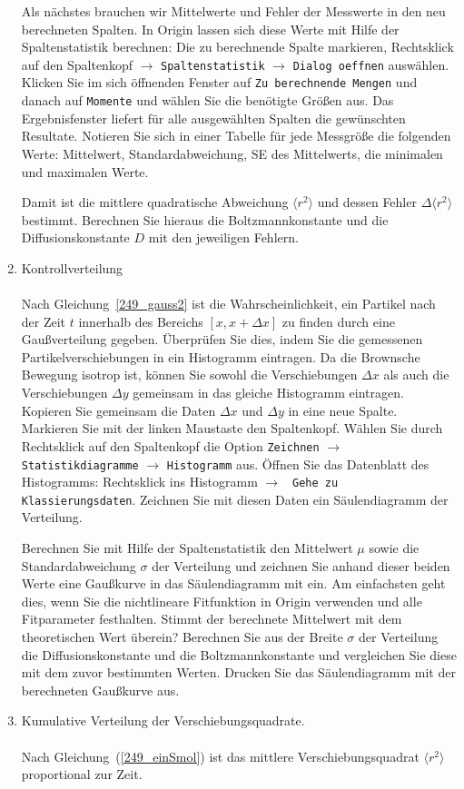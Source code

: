 \documentclass{../papanleitung}
\begin{document}
\begin{enumerate}
Als n\"{a}chstes brauchen wir Mittelwerte und Fehler der Messwerte in den neu berechneten
Spalten. In Origin lassen sich diese Werte mit Hilfe der Spaltenstatistik berechnen:
Die zu berechnende Spalte markieren, Rechtsklick auf den Spaltenkopf $\rightarrow$ \verb"Spaltenstatistik" $\rightarrow$ \verb"Dialog oeffnen" ausw\"{a}hlen.
Klicken Sie im sich \"{o}ffnenden Fenster auf  \verb"Zu berechnende Mengen" und danach auf \verb"Momente" und w\"{a}hlen Sie die ben\"{o}tigte Gr\"{o}{\ss}en aus.
Das Ergebnisfenster liefert f\"{u}r alle ausgew\"{a}hlten Spalten die gew\"{u}nschten Resultate.
Notieren Sie sich in einer Tabelle f\"{u}r jede Messgr\"{o}{\ss}e die folgenden Werte:
Mittelwert, Standardabweichung, SE des Mittelwerts, die minimalen und maximalen Werte.

Damit ist die mittlere quadratische Abweichung $\langle r^2 \rangle$ und dessen Fehler $\Delta\langle r^2 \rangle$ bestimmt.
Berechnen Sie hieraus die Boltzmannkonstante und die Diffusionskonstante $D$ mit den jeweiligen Fehlern.

\item Kontrollverteilung\\
\\Nach Gleichung~\ref{249_gauss2} ist die Wahrscheinlichkeit,
ein Partikel nach der Zeit $t$ innerhalb des Bereichs $[x,x+\Delta
x]$ zu finden durch eine Gau{\ss}verteilung gegeben. \"{U}berpr\"{u}fen Sie
dies, indem Sie die gemessenen Partikelverschiebungen in ein
Histogramm eintragen. Da die Brownsche Bewegung isotrop ist,
k\"{o}nnen Sie sowohl die Verschiebungen $\Delta x$ als auch die
Verschiebungen $\Delta y$ gemeinsam in das gleiche Histogramm
eintragen. Kopieren Sie gemeinsam die Daten $\Delta x$ und $\Delta y$ in eine neue Spalte. Markieren Sie mit der linken Maustaste den Spaltenkopf. W\"{a}hlen Sie durch Rechtsklick auf den Spaltenkopf die Option \verb"Zeichnen" $\rightarrow$ \verb"Statistikdiagramme" $\rightarrow$ \verb"Histogramm" aus. \"{O}ffnen Sie das Datenblatt des Histogramms: Rechtsklick ins Histogramm $\rightarrow$ \verb" Gehe zu Klassierungsdaten". Zeichnen Sie mit diesen Daten ein S\"{a}ulendiagramm der Verteilung.


Berechnen Sie mit Hilfe der Spaltenstatistik den Mittelwert $\mu$ sowie die
Standardabweichung $\sigma$ der Verteilung und zeichnen Sie anhand
dieser beiden Werte eine Gau{\ss}kurve in das S\"{a}ulendiagramm mit ein. Am einfachsten geht dies, wenn Sie die nichtlineare Fitfunktion in Origin verwenden und alle
Fitparameter festhalten.
Stimmt der berechnete Mittelwert mit dem theoretischen Wert
\"{u}berein? Berechnen Sie aus der Breite $\sigma$ der Verteilung die
Diffusions\-konstante und die Boltzmannkonstante und vergleichen
Sie diese mit dem zuvor bestimmten Werten. Drucken Sie das
S\"{a}ulendiagramm mit der berechneten Gau{\ss}kurve aus.
\item Kumulative Verteilung der Verschiebungsquadrate.\\
\\Nach Gleichung~(\ref{249_einSmol}) ist das mittlere
    Verschiebungsquadrat $\langle r^2 \rangle$ proportional zur
    Zeit.


\end{enumerate}
\end{document}
